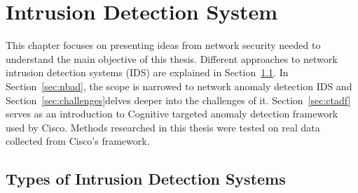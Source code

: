 \documentclass[thesis=B,english]{FITthesis}[2012/10/20]
\begin{document}


\chapter{Intrusion Detection System}

This chapter focuses on presenting ideas from network security needed to understand the main objective of this thesis.
Different approaches to network intrusion detection systems (IDS) are explained in Section~\ref{sec:ids}.
In Section~\ref{sec:nbad}, the scope is narrowed to network anomaly detection IDS and Section~\ref{sec:challenges}delves deeper into the challenges of it.
Section~\ref{sec:ctadf} serves as an introduction to Cognitive targeted anomaly detection framework used by Cisco.
Methods researched in this thesis were tested on real data collected from Cisco's framework. \\
                                                                                  
\section{Types of Intrusion Detection Systems}\label{sec:ids}                                  
                                                                                  
\end{document}
